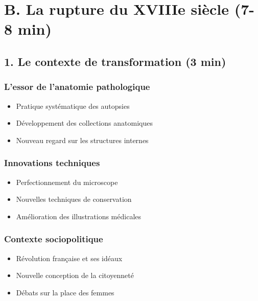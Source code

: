 \documentclass[
  letterpaper,
  DIV=11,
  numbers=noendperiod]{scrreprt}
\providecommand{\tightlist}{%
  \setlength{\itemsep}{0pt}\setlength{\parskip}{0pt}}\usepackage{longtable,booktabs,array}
\begin{document}
\subsection{}\label{section-6}


\chapter{B. La rupture du XVIIIe siècle (7-8
min)}\label{b.-la-rupture-du-xviiie-siuxe8cle-7-8-min}

\section{1. Le contexte de transformation (3
min)}\label{le-contexte-de-transformation-3-min}

\subsection{L'essor de l'anatomie
pathologique}\label{lessor-de-lanatomie-pathologique}

\begin{itemize}
\tightlist
\item
  Pratique systématique des autopsies
\item
  Développement des collections anatomiques
\item
  Nouveau regard sur les structures internes
\end{itemize}

\subsection{Innovations techniques}\label{innovations-techniques}

\begin{itemize}
\tightlist
\item
  Perfectionnement du microscope
\item
  Nouvelles techniques de conservation
\item
  Amélioration des illustrations médicales
\end{itemize}

\subsection{Contexte sociopolitique}\label{contexte-sociopolitique}

\begin{itemize}
\tightlist
\item
  Révolution française et ses idéaux
\item
  Nouvelle conception de la citoyenneté
\item
  Débats sur la place des femmes
\end{itemize}
\end{document}
